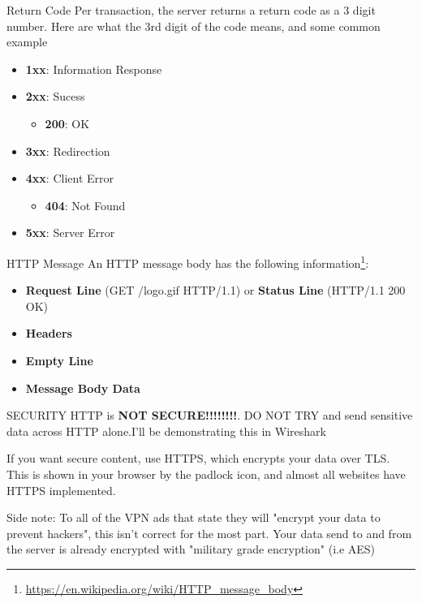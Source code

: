\begin{frame}{Return Code}
  Per transaction, the server returns a return code as a 3 digit number. Here are what the 3rd digit of the code means, and some common example
  \begin{itemize}
    \item \textbf{1xx}: Information Response
    \item \textbf{2xx}: Sucess
    \begin{itemize}
      \item \textbf{200}: OK
    \end{itemize}
    \item \textbf{3xx}: Redirection
    \item \textbf{4xx}: Client Error
    \begin{itemize}
      \item \textbf{404}: Not Found
    \end{itemize}
    \item \textbf{5xx}: Server Error
  \end{itemize}
\end{frame}

\begin{frame}{HTTP Message}
  An HTTP message body has the following information\footnote{\url{https://en.wikipedia.org/wiki/HTTP_message_body}}:
  \begin{itemize}
    \item \textbf{Request Line} (GET /logo.gif HTTP/1.1) or \textbf{Status Line} (HTTP/1.1 200 OK)
    \item \textbf{Headers}
    \item \textbf{Empty Line}
    \item \textbf{Message Body Data}
  \end{itemize}
\end{frame}

\begin{frame}{SECURITY}
  HTTP is \textbf{NOT SECURE!!!!!!!!}. DO NOT TRY and send sensitive data across HTTP alone.I'll be demonstrating this in Wireshark\pause

  If you want secure content, use HTTPS, which encrypts your data over TLS. This is shown in your browser by the padlock icon, and almost all websites have HTTPS implemented.\pause

  {\small Side note: To all of the VPN ads that state they will "encrypt your data to prevent hackers", this isn't correct for the most part. Your data send to and from the server is already encrypted with "military grade encryption" (i.e AES)}
\end{frame}

